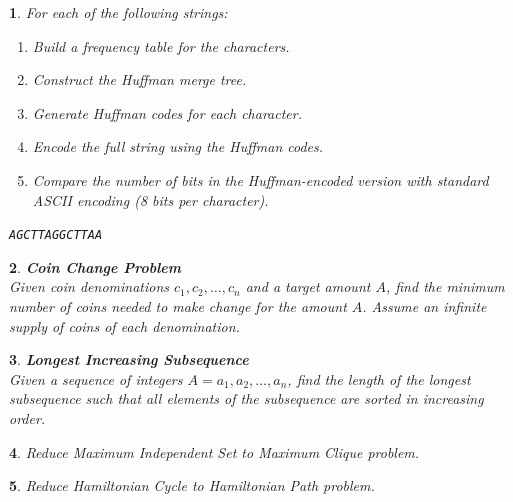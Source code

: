 \documentclass[%
addpoints]{exam}
\theoremstyle{problem}
\newtheorem{p}{}
\begin{document}
\begin{p}
For each of the following strings:
\begin{enumerate}[label=\alph*.]
    \item Build a frequency table for the characters.
    \item Construct the Huffman merge tree.
    \item Generate Huffman codes for each character.
    \item Encode the full string using the Huffman codes.
    \item Compare the number of bits in the Huffman-encoded version with standard ASCII encoding (8 bits per character).
\end{enumerate}

\texttt{AGCTTAGGCTTAA}
\hfill \end{p}

\begin{p}
\textbf{Coin Change Problem} \\[1ex]
Given coin denominations $c_1, c_2, \ldots, c_n$ and a target amount $A$, find the minimum number of coins needed to make change for the amount $A$. Assume an infinite supply of coins of each denomination.
\hfill \end{p}

\begin{p}
\textbf{Longest Increasing Subsequence}\\[1ex]
Given a sequence of integers $A = a_1, a_2, \ldots, a_n$, find the length of the longest subsequence such that all elements of the subsequence are sorted in increasing order.
\hfill \end{p}

\begin{p}
Reduce Maximum Independent Set to Maximum Clique problem.
\hfill \end{p}

\begin{p}
Reduce Hamiltonian Cycle to Hamiltonian Path problem.
\hfill \end{p}

\newpage

\end{document}
